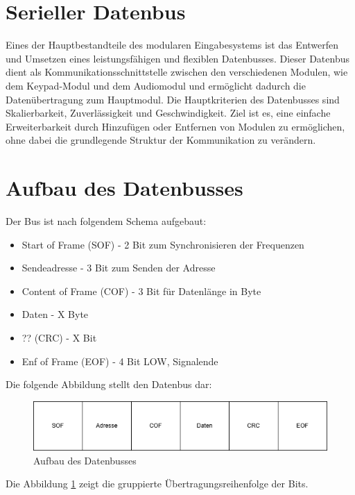 \section{Serieller Datenbus}
Eines der Hauptbestandteile des modularen Eingabesystems ist das Entwerfen und Umsetzen eines leistungsfähigen und flexiblen Datenbusses. Dieser Datenbus dient als Kommunikationsschnittstelle zwischen den verschiedenen Modulen, wie dem Keypad-Modul und dem Audiomodul und ermöglicht dadurch die Datenübertragung zum Hauptmodul. Die Hauptkriterien des Datenbusses sind Skalierbarkeit, Zuverlässigkeit und Geschwindigkeit. Ziel ist es, eine einfache Erweiterbarkeit durch Hinzufügen oder Entfernen von Modulen zu ermöglichen, ohne dabei die grundlegende Struktur der Kommunikation zu verändern.

\section{Aufbau des Datenbusses}
Der Bus ist nach folgendem Schema aufgebaut:
\begin{itemize}
    \item Start of Frame (SOF) - 2 Bit zum Synchronisieren der Frequenzen
    \item Sendeadresse -  3 Bit zum Senden der Adresse
    \item Content of Frame (COF) - 3 Bit für Datenlänge in Byte
    \item Daten - X Byte
    \item ?? (CRC) - X Bit
    \item Enf of Frame (EOF) - 4 Bit LOW, Signalende
\end{itemize}

Die folgende Abbildung stellt den Datenbus dar:
\begin{figure}[H]
    \centering    
    \includegraphics[width=1\textwidth]{Bilder/datenbus.png}
    \caption{Aufbau des Datenbusses}
    \label{Datenbus}
\end{figure}
Die Abbildung \ref{Datenbus} zeigt die gruppierte Übertragungsreihenfolge der Bits.
